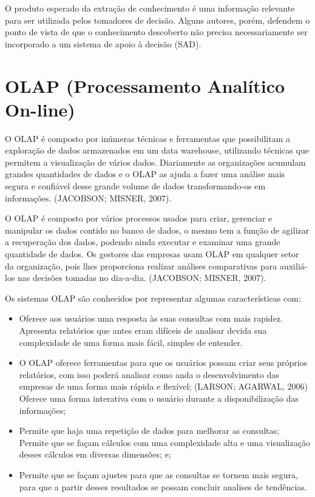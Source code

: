 O produto esperado da extra\c{c}\~{a}o de conhecimento \'{e} uma informa\c{c}\~{a}o relevante para ser utilizada pelos tomadores de decis\~{a}o. Alguns autores, por\'{e}m, defendem o ponto de vista de que o conhecimento descoberto n\~{a}o precisa necessariamente ser incorporado a um sistema de apoio \`{a} decis\~{a}o (SAD).

\section{OLAP (Processamento Analítico On-line)}

O OLAP é composto por inúmeras técnicas e ferramentas que possibilitam a exploração de dados armazenados em um data warehouse, utilizando técnicas que permitem a visualização de vários dados. Diariamente as organizações acumulam grandes quantidades de dados e o OLAP as ajuda a fazer uma análise mais segura e confiável desse grande volume de dados transformando-os em informações. (JACOBSON; MISNER, 2007).

O OLAP é composto por vários processos usados para criar, gerenciar e manipular os dados contido no banco de dados, o mesmo tem a função de agilizar a recuperação dos dados, podendo ainda executar e examinar uma grande quantidade de dados. Os gestores das empresas usam OLAP em qualquer setor da organização, pois lhes proporciona realizar análises comparativas para auxiliá-los nas decisões tomadas no dia-a-dia. (JACOBSON; MISNER, 2007).

Os sistemas OLAP são conhecidos por representar algumas características com:

\begin{itemize}
    
    \item Oferece aos usuários uma resposta às suas consultas com mais rapidez. Apresenta relatórios que antes eram difíceis de analisar devida sua complexidade de uma forma mais fácil, simples de entender.
    
    \item O OLAP oferece ferramentas para que os usuários possam criar seus próprios relatórios, com isso poderá analisar como anda o desenvolvimento das empresas de uma forma mais rápida e flexível; (LARSON; AGARWAL, 2006)
    Oferece uma forma interativa com o usuário durante a disponibilização das informações;
    
    \item Permite que haja uma repetição de dados para melhorar as consultas;
    Permite que se façam cálculos com uma complexidade alta e uma visualização desses cálculos em diversas dimensões; e;
    
    \item Permite que se façam ajustes para que as consultas se tornem mais segura, para que a partir desses resultados se possam concluir analises de tendências.

\end{itemize}

